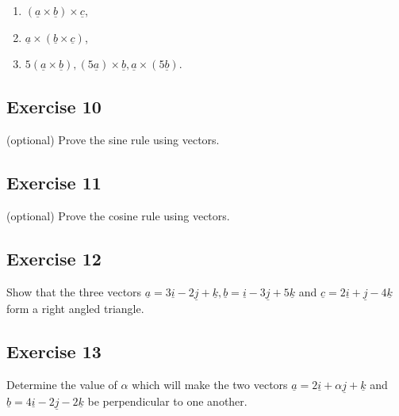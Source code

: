 \documentclass[
  11pt,
  oneside]{book}
\providecommand{\tightlist}{%
  \setlength{\itemsep}{0pt}\setlength{\parskip}{0pt}}
\newcommand{\slide}{}
\theoremstyle{definition}
\theoremstyle{definition}
\theoremstyle{definition}
\theoremstyle{definition}
\theoremstyle{remark}
\begin{document}
\begin{enumerate}
\def\labelenumi{\arabic{enumi}.}
\tightlist
\item
  \((\underline{a} \times \underline{b}) \times \underline{c}\),
\item
  \(\underline{a} \times (\underline{b} \times \underline{c})\),
\item
  \(5(\underline{a} \times \underline{b}), (5\underline{a})\times \underline{b}, \underline{a}\times(5\underline{b})\).
\end{enumerate}

\slide

\subsection*{Exercise 10}\label{exercise-10-1}

(optional) Prove the sine rule using vectors.

\slide

\subsection*{Exercise 11}\label{exercise-11-1}

(optional) Prove the cosine rule using vectors.

\slide

\subsection*{Exercise 12}\label{exercise-12}

Show that the three vectors \(\underline{a} = 3\underline{i} - 2\underline{j} + \underline{k}, \underline{b} = \underline{i} - 3\underline{j} + 5\underline{k}\) and \(\underline{c}= 2\underline{i} + \underline{j} - 4\underline{k}\) form a right angled triangle.

\slide

\subsection*{Exercise 13}\label{exercise-13}

Determine the value of \(\alpha\) which will make the two vectors \(\underline{a} = 2\underline{i} + \alpha\underline{j} + \underline{k}\) and \(\underline{b} = 4\underline{i} - 2\underline{j} - 2\underline{k}\) be perpendicular to one another.
\end{document}
